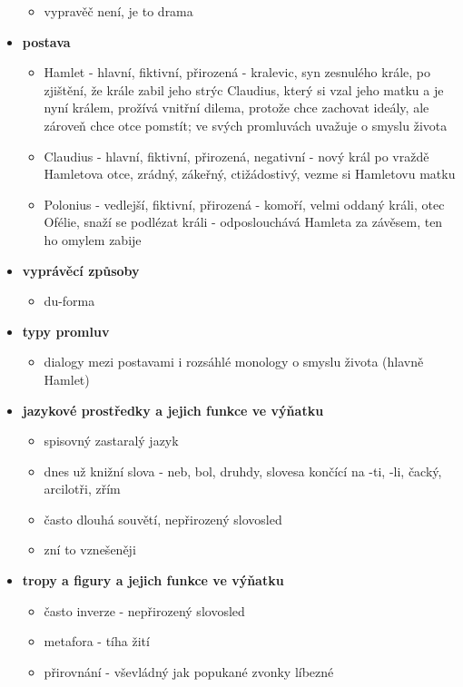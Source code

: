 \documentclass[11pt]{article}
\begin{document}
\begin{itemize}
\begin{itemize}
            \item vypravěč není, je to drama
        \end{itemize}
        \item\textbf{postava}
        \begin{itemize}
            \item Hamlet - hlavní, fiktivní, přirozená - kralevic, syn zesnulého krále, po zjištění, že krále zabil jeho strýc Claudius, který si vzal jeho matku a je nyní králem, prožívá vnitřní dilema, protože chce zachovat ideály, ale zároveň chce otce pomstít; ve svých promluvách uvažuje o smyslu života
            \item Claudius - hlavní, fiktivní, přirozená, negativní - nový král po vraždě Hamletova otce, zrádný, zákeřný, ctižádostivý, vezme si Hamletovu matku
            \item Polonius - vedlejší, fiktivní, přirozená - komoří, velmi oddaný králi, otec Ofélie, snaží se podlézat králi - odposlouchává Hamleta za závěsem, ten ho omylem zabije
        \end{itemize}
        \item\textbf{vyprávěcí způsoby}
        \begin{itemize}
            \item du-forma
        \end{itemize}
        \item\textbf{typy promluv}
        \begin{itemize}
            \item dialogy mezi postavami i rozsáhlé monology o smyslu života (hlavně Hamlet)
        \end{itemize}
        \item\textbf{jazykové prostředky a jejich funkce ve výňatku}
        \begin{itemize}
            \item spisovný zastaralý jazyk
            \item dnes už knižní slova - neb, bol, druhdy, slovesa končící na -ti, -li, čacký, arcilotři, zřím
            \item často dlouhá souvětí, nepřirozený slovosled
            \item zní to vznešeněji
        \end{itemize}
        \item\textbf{tropy a figury a jejich funkce ve výňatku}
        \begin{itemize}
            \item často inverze - nepřirozený slovosled
            \item metafora - tíha žití
            \item přirovnání - vševládný jak popukané zvonky líbezné
        \end{itemize}
    \end{itemize}
\end{document}
